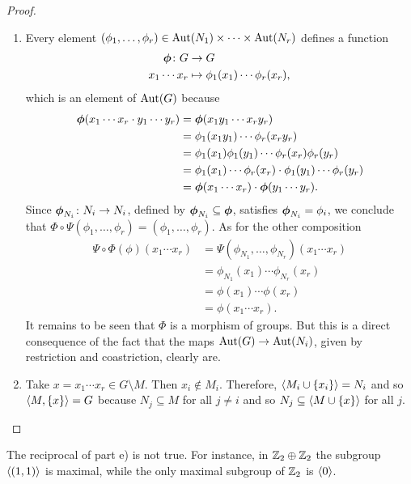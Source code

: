 \begin{proof}
\begin{enumerate}[\upshape a)]
    \item Every element $(\phi_1,\dots,\phi_r)\in{\rm Aut}(N_1)\times\cdots\times{\rm Aut}(N_r)$ defines a function
    \begin{align*}
        \textrm{\boldmath$\phi$}\colon G&\to G\\
        x_1\cdots x_r&\mapsto\phi_1(x_1)\cdots\phi_r(x_r),
    \end{align*}
    which is an element of ${\rm Aut}(G)$ because
    \begin{align*}
        \textrm{\boldmath$\phi$}(x_1\cdots x_r\cdot y_1\cdots y_r)
            &= \textrm{\boldmath$\phi$}(x_1y_1\cdots x_ry_r)\\
            &= \phi_1(x_1y_1)\cdots\phi_r(x_ry_r)\\
            &= \phi_1(x_1)\phi_1(y_1)\cdots\phi_r(x_r)\phi_r(y_r)\\
            &= \phi_1(x_1)\cdots\phi_r(x_r)\cdot\phi_1(y_1)\cdots\phi_r(y_r)\\
            &= \textrm{\boldmath$\phi$}(x_1\cdots x_r)\cdot\textrm{\boldmath$\phi$}(y_1\cdots y_r).
    \end{align*}
    Since $\textrm{\boldmath$\phi$}_{N_i}\colon N_i\to N_i$, defined by $\textrm{\boldmath$\phi$}_{N_i}\subseteq\textrm{\boldmath$\phi$}$, satisfies $\textrm{\boldmath$\phi$}_{N_i}=\phi_i$, we conclude that $\Phi\circ\Psi(\phi_1,\dots,\phi_r)=(\phi_1,\dots,\phi_r)$. As for the other composition
    \begin{align*}
        \Psi\circ\Phi(\phi)(x_1\cdots x_r) &= \Psi(\phi_{N_1},\dots,\phi_{N_r})(x_1\cdots x_r)\\
            &= \phi_{N_1}(x_1)\cdots\phi_{N_r}(x_r)\\
            &= \phi(x_1)\cdots\phi(x_r)\\
            &= \phi(x_1\cdots x_r).
    \end{align*}
    It remains to be seen that $\Phi$ is a morphism of groups. But this is a direct consequence of the fact that the maps ${\rm Aut}(G)\to{\rm Aut}(N_i)$, given by restriction and coastriction, clearly are.

    \item Take $x=x_1\cdots x_r\in G\setminus M$. Then $x_i\notin M_i$. Therefore, $\langle M_i\cup\{x_i\}\rangle=N_i$ and so $\langle M,\{x\}\rangle=G$ because $N_j\subseteq M$ for all $j\ne i$ and so $N_j\subseteq\langle M\cup\{x\}\rangle$ for all $j$.
\end{enumerate}
\end{proof}

\begin{rem}
    The reciprocal of part e) is not true. For instance, in $\mathbb{Z}_2\oplus\mathbb{Z}_2$ the subgroup $\langle(1,1)\rangle$ is maximal, while the only maximal subgroup of $\mathbb{Z}_2$ is $\langle0\rangle$.
\end{rem}

